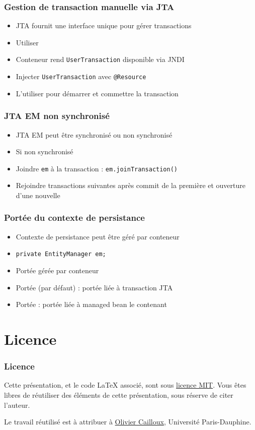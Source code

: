 \documentclass[french, english]{beamer}
\begin{document}
\begin{frame}
	\frametitle{Gestion de transaction manuelle via JTA}
	\begin{itemize}
		\item JTA fournit une interface unique pour gérer transactions
		\item Utiliser 
		\item Conteneur rend \texttt{UserTransaction} disponible via JNDI
		\item Injecter \texttt{UserTransaction} avec \texttt{@Resource}
		\item L’utiliser pour démarrer et commettre la transaction
	\end{itemize}
\end{frame}

\begin{frame}
	\frametitle{JTA EM non synchronisé}
	\begin{itemize}
		\item JTA EM peut être synchronisé ou non synchronisé
		\item Si non synchronisé
		\item Joindre \texttt{em} à la transaction : \texttt{em.joinTransaction()}
		\item Rejoindre transactions suivantes après commit de la première et ouverture d’une nouvelle
	\end{itemize}
\end{frame}

\begin{frame}
	\frametitle{Portée du contexte de persistance}
	\begin{itemize}
		\item Contexte de persistance peut être géré par conteneur
		\item {} \texttt{private EntityManager em;}
		\item Portée gérée par conteneur
		\item Portée  (par défaut) : portée liée à transaction JTA
		\item Portée  : portée liée à managed bean le contenant
	\end{itemize}
\end{frame}

\section{Licence}
\begin{frame}
	\frametitle{Licence}
	Cette présentation, et le code LaTeX associé, sont sous \href{https://opensource.org/licenses/MIT}{licence MIT}. Vous êtes libres de réutiliser des éléments de cette présentation, sous réserve de citer l’auteur.
	
	Le travail réutilisé est à attribuer à \href{http://www.lamsade.dauphine.fr/~ocailloux/}{Olivier Cailloux}, Université Paris-Dauphine.
\end{frame}
\end{document}
